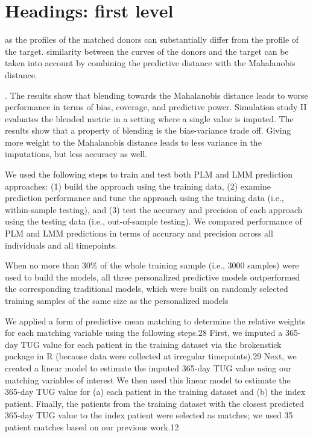 \documentclass{article}
\begin{document}
\hypertarget{headings-first-level}{%
\section{Headings: first level}\label{headings-first-level}}

as the profiles of the matched donors can substantially differ from the
profile of the target. similarity between the curves of the donors and
the target can be taken into account by combining the predictive
distance with the Mahalanobis distance.

. The results show that blending towards the Mahalanobis distance leads
to worse performance in terms of bias, coverage, and predictive power.
Simulation study II evaluates the blended metric in a setting where a
single value is imputed. The results show that a property of blending is
the bias-variance trade off. Giving more weight to the Mahalanobis
distance leads to less variance in the imputations, but less accuracy as
well.

We used the following steps to train and test both PLM and LMM
prediction approaches: (1) build the approach using the training data,
(2) examine prediction performance and tune the approach using the
training data (i.e., within-sample testing), and (3) test the accuracy
and precision of each approach using the testing data (i.e.,
out-of-sample testing). We compared performance of PLM and LMM
predictions in terms of accuracy and precision across all individuals
and all timepoints.

When no more than 30\% of the whole training sample (i.e., 3000 samples)
were used to build the models, all three personalized predictive models
outperformed the corresponding traditional models, which were built on
randomly selected training samples of the same size as the personalized
models

We applied a form of predictive mean matching to determine the relative
weights for each matching variable using the following steps.28 First,
we imputed a 365- day TUG value for each patient in the training dataset
via the brokenstick package in R (because data were collected at
irregular timepoints).29 Next, we created a linear model to estimate the
imputed 365-day TUG value using our matching variables of interest We
then used this linear model to estimate the 365-day TUG value for (a)
each patient in the training dataset and (b) the index patient. Finally,
the patients from the training dataset with the closest predicted
365-day TUG value to the index patient were selected as matches; we used
35 patient matches based on our previous work.12
\end{document}
